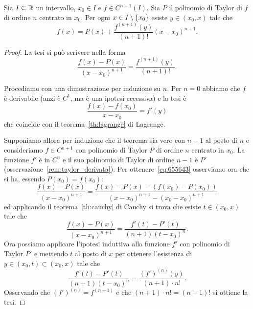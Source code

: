 \begin{theorem}
\label{th:taylor_lagrange}%
\mymark{**}%
%
%
Sia $I\subseteq {\mathbb R}$ un intervallo, $x_0\in I$
e $f\in C^{n+1}(I)$.
Sia $P$ il polinomio di Taylor di $f$ di ordine $n$ centrato in $x_0$.
Per ogni $x\in I\setminus{\left\{ x_0 \right\}}$ esiste $y\in (x_0,x)$
tale che
\[
  f(x) = P(x) + \frac{f^{(n+1)}(y)}{(n+1)!}(x-x_0)^{n+1}.
\]
\end{theorem}
%
\begin{proof}\mymark{*}%
La tesi si può scrivere nella forma 
\[
  \frac{f(x) - P(x)}{(x-x_0)^{n+1}} 
  = \frac{f^{(n+1)}(y)}{(n+1)!}.
\]

Procediamo con una dimostrazione per induzione su $n$. 
Per $n=0$ abbiamo che $f$ è derivabile (anzi è $C^1$, ma è una 
ipotesi eccessiva) e la tesi è
\begin{equation}\label{eq:655643}
  \frac{f(x) - f(x_0)}{x-x_0}  = f'(y)  
\end{equation}
che coincide con il teorema~\ref{th:lagrange} di Lagrange.

Supponiamo allora per induzione 
che il teorema sia vero con $n-1$ al posto 
di $n$ e consideriamo $f\in C^{n+1}$ con polinomio di Taylor $P$
di ordine $n$ centrato in $x_0$. 
La funzione $f'$ è in $C^{n}$ e il suo polinomio 
di Taylor di ordine $n-1$ è $P'$ (osservazione~\ref{rem:taylor_derivata}).
Per ottenere~\eqref{eq:655643} osserviamo ora che si ha,
essendo $P(x_0)=f(x_0)$:
\[
  \frac{f(x)-P(x)}{(x-x_0)^{n+1}}  
  = \frac{f(x) - P(x) - (f(x_0)-P(x_0))}{(x-x_0)^{n+1} - (x_0-x_0)^{n+1}}
\]
ed applicando il teorema~\ref{th:cauchy} di Cauchy
si trova che esiste $t\in (x_0,x)$ tale che
\[
  \frac{f(x)-P(x)}{(x-x_0)^{n+1}}  
  = \frac{f'(t)-P'(t)}{(n+1)(t-x_0)^n}. 
\]
Ora possiamo applicare l'ipotesi induttiva alla funzione 
$f'$ con polinomio di Taylor $P'$
e mettendo $t$ al posto di $x$ per ottenere 
l'esistenza di $y\in (x_0,t)\subset(x_0,x)$ tale che 
\[
  \frac{f'(t)-P'(t)}{(n+1)(t-x_0)^n}
  = \frac{(f')^{(n)}(y)}{(n+1)\cdot n!}.
\]
Osservando che $(f')^{(n)} = f^{(n+1)}$ e che $(n+1)\cdot n!=(n+1)!$ 
si ottiene la tesi.
\end{proof}

